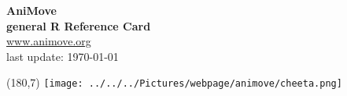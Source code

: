 \documentclass[8pt,landscape]{article}
\begin{document}
\begin{center}
 
 {\Large{\textbf{\color{blue}AniMove\\ \smallskip general R Reference Card}}} \\ \url{www.animove.org}\\
 last update: \today
 \end{center}

% 
   \begin{textblock}{20}(180,7)
      \texttt{[image: ../../../Pictures/webpage/animove/cheeta.png]}
    \end{textblock}
 
\bigskip
\end{document}
